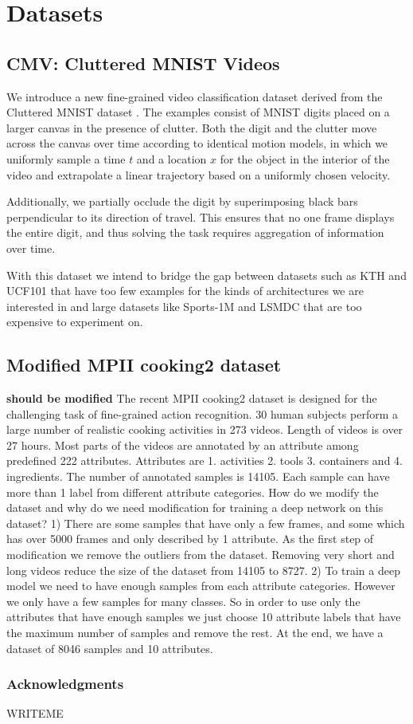 \documentclass{article} %
\begin{document}
\section{Datasets}
\subsection{CMV: Cluttered MNIST Videos}

We introduce a new fine-grained video classification dataset derived from the Cluttered MNIST dataset \cite{clutteredmnist}.
The examples consist of MNIST digits placed on a larger canvas in the presence of clutter.
Both the digit and the clutter move across the canvas over time according to identical motion models, in which we uniformly sample a time $t$ and a location $x$ for the object in the interior of the video and extrapolate a linear trajectory based on a uniformly chosen velocity.

Additionally, we partially occlude the digit by superimposing black bars perpendicular to its direction of travel.
This ensures that no one frame displays the entire digit, and thus solving the task requires aggregation of information over time.

With this dataset we intend to bridge the gap between datasets such as KTH \cite{kth} and UCF101 \cite{ucf101} that have too few examples for the kinds of architectures we are interested in and large datasets like Sports-1M \cite{sports1m} and LSMDC \cite{lsmdc} that are too expensive to experiment on.

\subsection{Modified MPII cooking2 dataset}
\textbf{should be modified} The recent MPII cooking2 dataset is designed for the challenging task of fine-grained action recognition. 30 human subjects perform a large number of realistic cooking activities in 273 videos. Length of videos is over 27 hours. Most parts of the videos are annotated by an attribute among predefined 222 attributes. Attributes are 1. activities 2. tools 3. containers and 4. ingredients. The number of annotated samples is 14105. Each sample can have more than 1 label from different attribute categories. 
How do we modify the dataset and why do we need modification for training a deep network on this dataset? 
1) There are some samples that have only a few frames, and some which has over 5000 frames and only described by 1 attribute. As the first step of modification we remove the outliers from the dataset. Removing very short and long videos reduce the size of the dataset from 14105 to 8727.
2) To train a deep model we need to have enough samples from each attribute categories. However we only have a few samples for many classes. So in order to use only the attributes that have enough samples we just choose 10 attribute labels that have the maximum number of samples and remove the rest. At the end, we have a dataset of 8046 samples and 10 attributes.
\subsubsection*{Acknowledgments}

WRITEME



\end{document}
